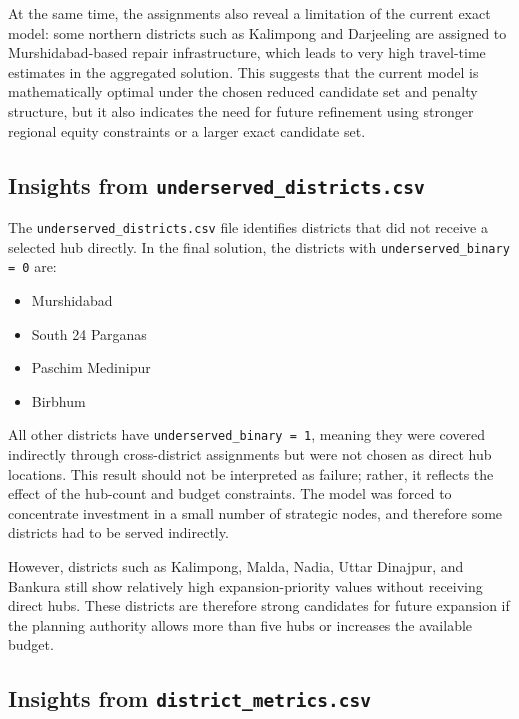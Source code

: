 At the same time, the assignments also reveal a limitation of the current exact model: some northern districts such as Kalimpong and Darjeeling are assigned to Murshidabad-based repair infrastructure, which leads to very high travel-time estimates in the aggregated solution. This suggests that the current model is mathematically optimal under the chosen reduced candidate set and penalty structure, but it also indicates the need for future refinement using stronger regional equity constraints or a larger exact candidate set.

\subsection{Insights from \texttt{underserved\_districts.csv}}

The \texttt{underserved\_districts.csv} file identifies districts that did not receive a selected hub directly. In the final solution, the districts with \texttt{underserved\_binary = 0} are:
\begin{itemize}
    \item Murshidabad
    \item South 24 Parganas
    \item Paschim Medinipur
    \item Birbhum
\end{itemize}

All other districts have \texttt{underserved\_binary = 1}, meaning they were covered indirectly through cross-district assignments but were not chosen as direct hub locations. This result should not be interpreted as failure; rather, it reflects the effect of the hub-count and budget constraints. The model was forced to concentrate investment in a small number of strategic nodes, and therefore some districts had to be served indirectly.

However, districts such as Kalimpong, Malda, Nadia, Uttar Dinajpur, and Bankura still show relatively high expansion-priority values without receiving direct hubs. These districts are therefore strong candidates for future expansion if the planning authority allows more than five hubs or increases the available budget.

\subsection{Insights from \texttt{district\_metrics.csv}}

